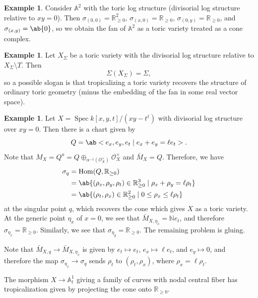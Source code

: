 \documentclass{amsart}
\theoremstyle{definition}
\newtheorem{exm}[thm]{Example}
\theoremstyle{remark}
\theoremstyle{plain}
\theoremstyle{definition}
\theoremstyle{remark}
\newcommand{\A}{\mathbb{A}}
\newcommand{\N}{\mathbb{N}}
\newcommand{\R}{\mathbb{R}}
\newcommand{\mc}[1]{\mathcal{#1}}
\newcommand{\1}{\mathbf{1}}
\newcommand{\2}{\mathbf{2}}
\newcommand{\3}{\mathbf{3}}
\DeclareMathOperator{\Hom}{Hom}
\DeclareMathOperator{\Spec}{Spec}
\begin{document}
\begin{exm}
    Consider \(\A^2\) with the toric log structure (divisorial log structure relative to \(xy = 0\)). Then \(\sigma_{(0,0)} = \R^2_{\geq 0}\), \(\sigma_{(x,0)} = \R_{\geq 0}\), \(\sigma_{(0,y)} = \R_{\geq 0}\), and \(\sigma_{(x,y)} = \ab\{0\}\), so we obtain the fan of \(\A^2\) as a toric variety treated as a cone complex.
\end{exm}

\begin{exm}
    Let \(X_{\Sigma}\) be a toric variety with the divisorial log structure relative to \(X_{\Sigma} \setminus T\). Then
    \[ \Sigma(X_{\Sigma}) = \Sigma, \]
    so a possible slogan is that tropicalizing a toric variety recovers the structure of ordinary toric geometry (minus the embedding of the fan in some real vector space).
\end{exm}

\begin{exm}
    Let \(X = \Spec k[x,y,t]/(xy-t^{\ell})\) with divisorial log structure over \(xy = 0\). Then there is a chart given by
    \[ Q = \ab<e_x, e_y, e_t \mid e_x + e_y = \ell e_t>. \]
    Note that \(M_X = Q^a = Q \oplus_{\alpha^{-1}(\mc{O}_X^{\times})} \mc{O}_X^{\times}\) and \(\bar{M}_X = Q\). Therefore, we have
    \begin{align*}
        \sigma_q &= \Hom(Q, \R_{\geq 0}) \\
        &= \ab\{ (\rho_x, \rho_y, \rho_t) \in \R_{\geq 0}^3 \mid \rho_x + \rho_y = \ell \rho_t \} \\
        &= \ab\{ (\rho_t, \rho_x) \in \R_{\geq 0}^2 \mid 0 \leq \rho_x \leq \ell \rho_t \}
    \end{align*}
    at the singular point \(q\), which recovers the cone which gives \(X\) as a toric variety. At the generic point \(\eta_x\) of \(x = 0\), we see that \(\bar{M}_{X, \eta_x} = \N e_t\), and therefore \(\sigma_{\eta_x} = \R_{\geq 0}\). Similarly, we see that \(\sigma_{\eta_y} = \R_{\geq 0}\). The remaining problem is gluing. 

    Note that \(\bar{M}_{X, q} \to \bar{M}_{X, \eta_x}\) is given by \(e_t \mapsto e_t\), \(e_x \mapsto \ell e_t\), and \(e_y \mapsto 0\), and therefore the map \(\sigma_{\eta_x} \to \sigma_q\) sends \(\rho_t\) to \((\rho_t, \rho_x)\), where \(\rho_x = \ell \rho_t\).

    The morphism \(X \to \A^1_t\) giving a family of curves with nodal central fiber has tropicalization given by projecting the cone onto \(\R_{\geq 0}\).
\end{exm}
\end{document}
